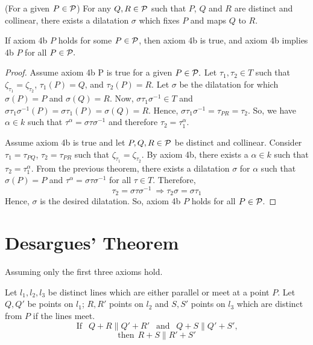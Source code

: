 \begin{axiom}[4b $P$]
    (For a given $P \in \mathcal{P}$) For any $Q,R \in \mathcal{P}$ such that $P$, $Q$ and $R$ are distinct and collinear, there exists a dilatation $\sigma$ which fixes $P$ and maps $Q$ to $R$.
\end{axiom}

\begin{theorem}
    If axiom 4b $P$ holds for some $P \in \mathcal{P}$, then axiom 4b is true, and axiom 4b implies 4b $P$ for all $P \in \mathcal{P}.$
\end{theorem}

\begin{proof}
    Assume axiom 4b P is true for a given $P \in \mathcal{P}.$ Let $\tau_1, \tau_2 \in T$ such that $\zeta_{\tau_1} = \zeta_{\tau_2}$, $\tau_1(P)=Q$, and $\tau_2(P)=R$. Let $\sigma$ be the dilatation for which $\sigma(P)=P$ and $\sigma(Q)=R$. Now, $\sigma\tau_1\sigma^{-1} \in T$ and $\sigma\tau_1\sigma^{-1}(P) = \sigma\tau_1(P)=\sigma(Q)=R. $ Hence, $\sigma\tau_1\sigma^{-1} = \tau_{PR}=\tau_2$. So, we have $\alpha \in k$ such that $\tau^\alpha = \sigma\tau\sigma^{-1}$ and therefore $\tau_2=\tau_1^\alpha.$

    Assume axiom 4b is true and let $P,Q,R \in \mathcal{P}$ be distinct and collinear. Consider $\tau_1=\tau_{PQ}$, $\tau_2=\tau_{PR}$ such that $\zeta_{\tau_1} = \zeta_{\tau_2}$. By axiom 4b, there exists a $\alpha \in k$ such that $\tau_2=\tau_1^\alpha$. From the previous theorem, there exists a dilatation $\sigma$ for $\alpha$ such that $\sigma(P)=P$ and $\tau^{\alpha} = \sigma\tau\sigma^{-1}$ for all $\tau \in T.$ Therefore,
    \[
    \tau_2=\sigma\tau\sigma^{-1} \: \Rightarrow \tau_2\sigma=\sigma\tau_1
    \]
    Hence, $\sigma$ is the desired dilatation. So, axiom 4b $P$ holds for all $P \in \mathcal{P}$.
\end{proof}

\section{Desargues' Theorem}

Assuming only the first three axioms hold. 

\begin{theorem}
    Let $l_1, l_2, l_3$ be distinct lines which are either parallel or meet at a point $P$. Let $Q, Q'$ be points on $l_1$; $R, R'$ points on $l_2$ and $S, S'$ points on $l_3$ which are distinct from $P$ if the lines meet.
    \[
    \text{If } \: \: Q+R \parallel Q'+R' \: \:  \text{ and } \: \: Q+S \parallel Q' +S'\text{,}
    \]
    \[
    \text{then} \: \: R+S \parallel R'+S'
    \]
\end{theorem}

